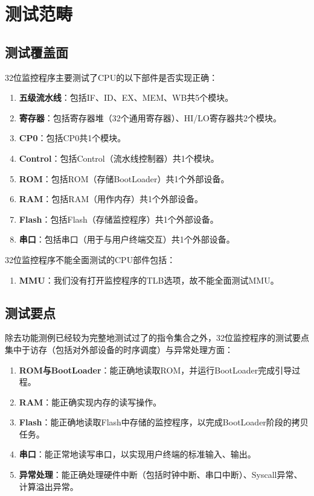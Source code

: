 \section{测试范畴}

\subsection{测试覆盖面}


32位监控程序主要测试了CPU的以下部件是否实现正确：

\begin{enumerate}
    \item {\bf 五级流水线}：包括IF、ID、EX、MEM、WB共5个模块。
    \item {\bf 寄存器}：包括寄存器堆（32个通用寄存器）、HI/LO寄存器共2个模块。
    \item {\bf CP0}：包括CP0共1个模块。
    \item {\bf Control}：包括Control（流水线控制器）共1个模块。
    \item {\bf ROM}：包括ROM（存储BootLoader）共1个外部设备。
    \item {\bf RAM}：包括RAM（用作内存）共1个外部设备。
    \item {\bf Flash}：包括Flash（存储监控程序）共1个外部设备。
    \item {\bf 串口}：包括串口（用于与用户终端交互）共1个外部设备。
\end{enumerate}

32位监控程序不能全面测试的CPU部件包括：

\begin{enumerate}
    \item {\bf MMU}：我们没有打开监控程序的TLB选项，故不能全面测试MMU。
\end{enumerate}

\subsection{测试要点}

除去功能测例已经较为完整地测试过了的指令集合之外，32位监控程序的测试要点集中于访存（包括对外部设备的时序调度）与异常处理方面：

\begin{enumerate}
    \item {\bf ROM与BootLoader}：能正确地读取ROM，并运行BootLoader完成引导过程。
    \item {\bf RAM}：能正确实现内存的读写操作。
    \item {\bf Flash}：能正确地读取Flash中存储的监控程序，以完成BootLoader阶段的拷贝任务。
    \item {\bf 串口}：能正常地读写串口，以实现用户终端的标准输入、输出。
    \item {\bf 异常处理}：能正确处理硬件中断（包括时钟中断、串口中断）、Syscall异常、计算溢出异常。
\end{enumerate}

